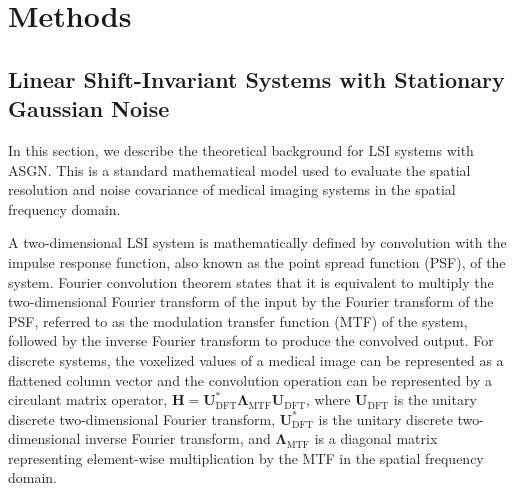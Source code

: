 \documentclass[12pt,]{article}
\begin{document}
\section{Methods}

\subsection{Linear Shift-Invariant Systems with Stationary Gaussian Noise}

In this section, we describe the theoretical background for LSI systems with ASGN. This is a standard mathematical model used to evaluate the spatial resolution and noise covariance of medical imaging systems in the spatial frequency domain.



A two-dimensional LSI system is mathematically defined by convolution with the impulse response function, also known as the point spread function (PSF), of the system. Fourier convolution theorem states that it is equivalent to multiply the two-dimensional Fourier transform of the input by the Fourier transform of the PSF, referred to as the modulation transfer function (MTF) of the system, followed by the inverse Fourier transform to produce the convolved output. For discrete systems, the voxelized values of a medical image can be represented as a flattened column vector and the convolution operation can be represented by a circulant matrix operator, $\mathbf{H} = \mathbf{U}^*_\text{DFT} \boldsymbol{\Lambda}_\text{MTF} \mathbf{U}_\text{DFT}$, where $\mathbf{U}_\text{DFT}$ is the unitary discrete two-dimensional Fourier transform, $\mathbf{U}^*_\text{DFT}$ is the unitary discrete two-dimensional inverse Fourier transform, and  $\boldsymbol{\Lambda}_\text{MTF}$ is a diagonal matrix representing element-wise multiplication by the MTF in the spatial frequency domain. 

\end{document}
